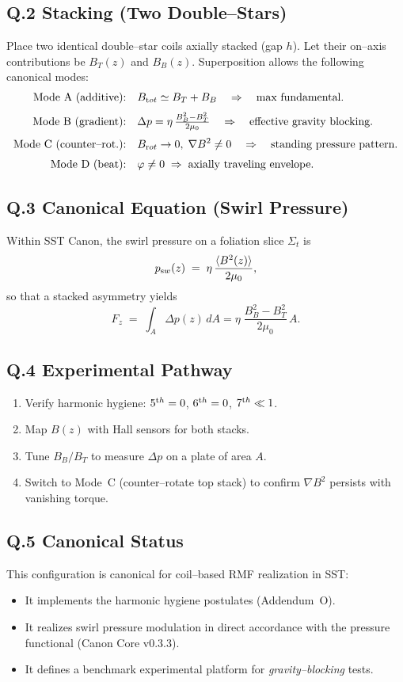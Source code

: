 \documentclass[11pt,a4paper]{article}
\begin{document}
\subsection*{Q.2 Stacking (Two Double--Stars)}
Place two identical double--star coils axially stacked (gap $h$).
Let their on--axis contributions be $B_T(z)$ and $B_B(z)$.
Superposition allows the following canonical modes:
\begin{align*}
	\text{Mode A (additive):}&\quad B_{\textrm tot}\simeq B_T+B_B
	\quad\Rightarrow\quad \text{max fundamental}.\\[3pt]
	\text{Mode B (gradient):}&\quad \Delta p = \eta\,\tfrac{B_B^2-B_T^2}{2\mu_0}
	\quad\Rightarrow\quad \text{effective gravity blocking}.\\[3pt]
	\text{Mode C (counter--rot.):}&\quad B_{\textrm rot}\to 0,\;
	\nabla B^2\neq 0
	\quad\Rightarrow\quad \text{standing pressure pattern}.\\[3pt]
	\text{Mode D (beat):}&\quad \varphi\neq 0\;\Rightarrow\;\text{axially traveling envelope}.
\end{align*}

\subsection*{Q.3 Canonical Equation (Swirl Pressure)}
Within SST Canon, the swirl pressure on a foliation slice $\Sigma_t$ is
\[
	p_{\textrm sw}(z) \;=\; \eta\,\frac{\langle B^2(z)\rangle}{2\mu_0},
\]
so that a stacked asymmetry yields
\[
	F_z \;=\; \int_A \Delta p(z)\,dA
	=\eta\;\frac{B_B^2-B_T^2}{2\mu_0}\,A.
\]

\subsection*{Q.4 Experimental Pathway}
\begin{enumerate}
	\item Verify harmonic hygiene: $5^{\textrm th}=0$, $6^{\textrm th}=0$, $7^{\textrm th}\ll1$.
	\item Map $B(z)$ with Hall sensors for both stacks.
	\item Tune $B_B/B_T$ to measure $\Delta p$ on a plate of area $A$.
	\item Switch to Mode~C (counter--rotate top stack) to confirm $\nabla B^2$ persists with vanishing torque.
\end{enumerate}

\subsection*{Q.5 Canonical Status}
This configuration is canonical for coil--based RMF realization in SST:
\begin{itemize}
	\item It implements the harmonic hygiene postulates (Addendum~O).
	\item It realizes swirl pressure modulation in direct accordance with the pressure functional (Canon Core v0.3.3).
	\item It defines a benchmark experimental platform for \emph{gravity--blocking} tests.
\end{itemize}
\end{document}
